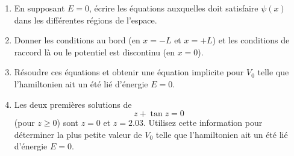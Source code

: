 \begin{enumerate}
\item
En supposant $E=0$, écrire les équations auxquelles doit satisfaire $\psi(x)$ dans les différentes régions de l'espace.

\item
Donner les conditions au bord (en $x=-L$ et $x=+L$) et les conditions de raccord là ou le potentiel est discontinu (en $x=0$).

\item
Résoudre ces équations et obtenir une équation implicite pour $V_0$ telle que l'hamiltonien ait un été lié d'énergie $E=0$.
\item

Les deux premières solutions de $$z+ \tan z =0$$ 
(pour $z\geq 0$) sont
$z=0$ et $z=2.03$. Utilisez cette information pour déterminer la  plus petite valeur de $V_0$ telle que l'hamiltonien ait un été lié d'énergie $E=0$.


\end{enumerate}